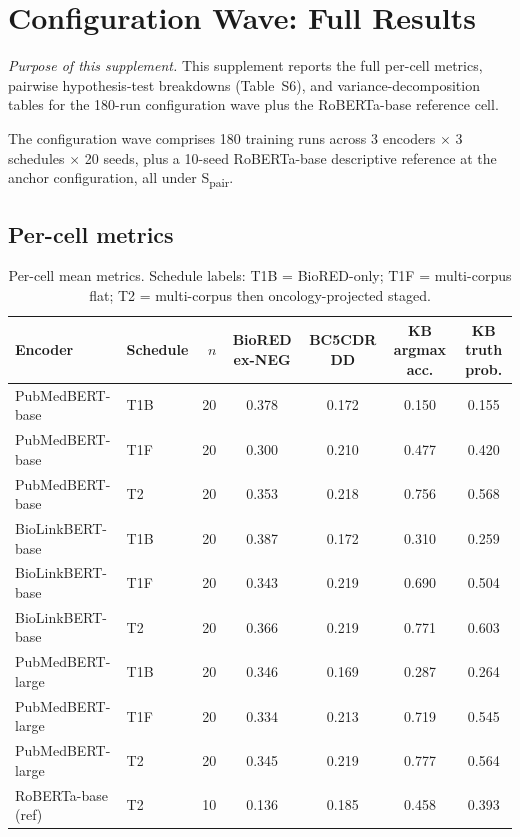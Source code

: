 \section{Configuration Wave: Full Results}
\label{supp:wave-b}

\textit{Purpose of this supplement.}\;
This supplement reports the full per-cell metrics, pairwise
hypothesis-test breakdowns (Table~S6), and variance-decomposition
tables for the 180-run configuration wave plus the RoBERTa-base
reference cell.

The configuration wave comprises 180 training runs across 3 encoders
$\times$ 3 schedules $\times$ 20 seeds, plus a 10-seed RoBERTa-base
descriptive reference at the anchor configuration, all under
S\textsubscript{pair}.

\subsection{Per-cell metrics}

\begin{table}[H]
\centering
\caption{Per-cell mean metrics. Schedule labels: T1B = BioRED-only;
T1F = multi-corpus flat; T2 = multi-corpus then oncology-projected
staged.}
\label{tab:s6-cells}
\small
\begin{tabular}{@{}llrcccc@{}}
\toprule
\textbf{Encoder} & \textbf{Schedule} & \textbf{$n$} & \textbf{BioRED ex-NEG} & \textbf{BC5CDR DD} & \textbf{KB argmax acc.} & \textbf{KB truth prob.} \\
\midrule
PubMedBERT-base    & T1B & 20 & 0.378 & 0.172 & 0.150 & 0.155 \\
PubMedBERT-base    & T1F & 20 & 0.300 & 0.210 & 0.477 & 0.420 \\
PubMedBERT-base    & T2  & 20 & 0.353 & 0.218 & 0.756 & 0.568 \\
\addlinespace
BioLinkBERT-base   & T1B & 20 & 0.387 & 0.172 & 0.310 & 0.259 \\
BioLinkBERT-base   & T1F & 20 & 0.343 & 0.219 & 0.690 & 0.504 \\
BioLinkBERT-base   & T2  & 20 & 0.366 & 0.219 & 0.771 & 0.603 \\
\addlinespace
PubMedBERT-large   & T1B & 20 & 0.346 & 0.169 & 0.287 & 0.264 \\
PubMedBERT-large   & T1F & 20 & 0.334 & 0.213 & 0.719 & 0.545 \\
PubMedBERT-large   & T2  & 20 & 0.345 & 0.219 & 0.777 & 0.564 \\
\midrule
RoBERTa-base (ref) & T2  & 10 & 0.136 & 0.185 & 0.458 & 0.393 \\
\bottomrule
\end{tabular}
\end{table}

